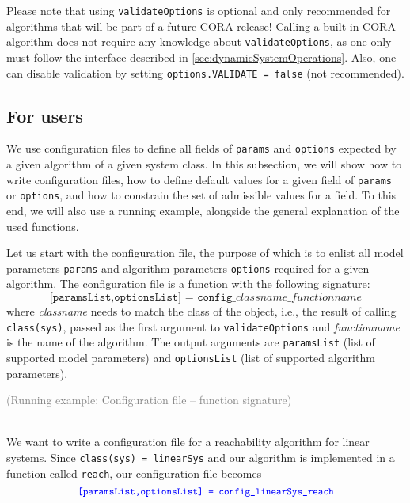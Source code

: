 Please note that using \texttt{validateOptions} is optional and only recommended for algorithms that will be part of a future CORA release!
Calling a built-in CORA algorithm does not require any knowledge about \texttt{validateOptions}, as one only must follow the interface described in \cref{sec:dynamicSystemOperations}.
Also, one can disable validation by setting \texttt{options.VALIDATE = false} (not recommended).


\subsection{For users}
\label{ssec:inputvalidation_users}

We use configuration files to define all fields of \texttt{params} and \texttt{options} expected by a given algorithm of a given system class.
In this subsection, we will show how to write configuration files, how to define default values for a given field of \texttt{params} or \texttt{options}, and how to constrain the set of admissible values for a field.
To this end, we will also use a running example, alongside the general explanation of the used functions.

Let us start with the configuration file, the purpose of which is to enlist all model parameters \texttt{params} and algorithm parameters \texttt{options} required for a given algorithm.
The configuration file is a function with the following signature:
\begin{equation*}
	\texttt{[paramsList,optionsList] = config\_}\textit{classname}\texttt{\_}\textit{functionname}
\end{equation*}
where \textit{classname} needs to match the class of the object, i.e., the result of calling \texttt{class(sys)}, passed as the first argument to \texttt{validateOptions} and \textit{functionname} is the name of the algorithm.
The output arguments are \texttt{paramsList} (list of supported model parameters) and \texttt{optionsList} (list of supported algorithm parameters).

\begin{tcolorbox}
	\begin{scriptsize} \textcolor{gray}{(Running example: Configuration file -- function signature)} \end{scriptsize} \\
	We want to write a configuration file for a reachability algorithm for linear systems.
	Since \texttt{class(sys) = linearSys} and our algorithm is implemented in a function called \texttt{reach}, our configuration file becomes
	\begin{equation*}
		\textcolor{blue}{\small{\texttt{[paramsList,optionsList] = config\_linearSys\_reach}}}
	\end{equation*}
\end{tcolorbox}

